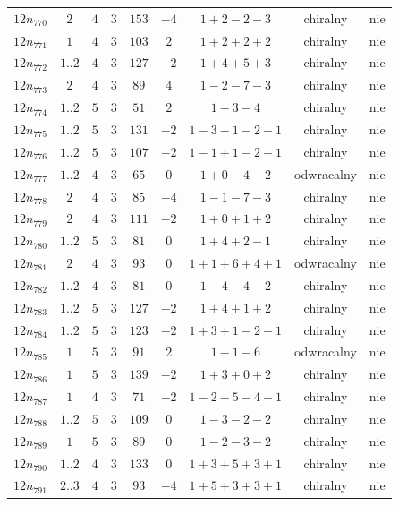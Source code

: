 \begin{longtable}{ccccccccc}
$12n_{770}$ & $2$ & $4$ & $3$ & $153$ & $-4$ & $1+2-2-3$ & chiralny & nie \\
$12n_{771}$ & $1$ & $4$ & $3$ & $103$ & $2$ & $1+2+2+2$ & chiralny & nie \\
$12n_{772}$ & $1..2$ & $4$ & $3$ & $127$ & $-2$ & $1+4+5+3$ & chiralny & nie \\
$12n_{773}$ & $2$ & $4$ & $3$ & $89$ & $4$ & $1-2-7-3$ & chiralny & nie \\
$12n_{774}$ & $1..2$ & $5$ & $3$ & $51$ & $2$ & $1-3-4$ & chiralny & nie \\
$12n_{775}$ & $1..2$ & $5$ & $3$ & $131$ & $-2$ & $1-3-1-2-1$ & chiralny & nie \\
$12n_{776}$ & $1..2$ & $5$ & $3$ & $107$ & $-2$ & $1-1+1-2-1$ & chiralny & nie \\
$12n_{777}$ & $1..2$ & $4$ & $3$ & $65$ & $0$ & $1+0-4-2$ & odwracalny & nie \\
$12n_{778}$ & $2$ & $4$ & $3$ & $85$ & $-4$ & $1-1-7-3$ & chiralny & nie \\
$12n_{779}$ & $2$ & $4$ & $3$ & $111$ & $-2$ & $1+0+1+2$ & chiralny & nie \\
$12n_{780}$ & $1..2$ & $5$ & $3$ & $81$ & $0$ & $1+4+2-1$ & chiralny & nie \\
$12n_{781}$ & $2$ & $4$ & $3$ & $93$ & $0$ & $1+1+6+4+1$ & odwracalny & nie \\
$12n_{782}$ & $1..2$ & $4$ & $3$ & $81$ & $0$ & $1-4-4-2$ & chiralny & nie \\
$12n_{783}$ & $1..2$ & $5$ & $3$ & $127$ & $-2$ & $1+4+1+2$ & chiralny & nie \\
$12n_{784}$ & $1..2$ & $5$ & $3$ & $123$ & $-2$ & $1+3+1-2-1$ & chiralny & nie \\
$12n_{785}$ & $1$ & $5$ & $3$ & $91$ & $2$ & $1-1-6$ & odwracalny & nie \\
$12n_{786}$ & $1$ & $5$ & $3$ & $139$ & $-2$ & $1+3+0+2$ & chiralny & nie \\
$12n_{787}$ & $1$ & $4$ & $3$ & $71$ & $-2$ & $1-2-5-4-1$ & chiralny & nie \\
$12n_{788}$ & $1..2$ & $5$ & $3$ & $109$ & $0$ & $1-3-2-2$ & chiralny & nie \\
$12n_{789}$ & $1$ & $5$ & $3$ & $89$ & $0$ & $1-2-3-2$ & chiralny & nie \\
$12n_{790}$ & $1..2$ & $4$ & $3$ & $133$ & $0$ & $1+3+5+3+1$ & chiralny & nie \\
$12n_{791}$ & $2..3$ & $4$ & $3$ & $93$ & $-4$ & $1+5+3+3+1$ & chiralny & nie \\

\end{longtable}
